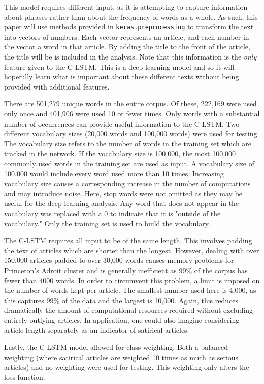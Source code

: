 \documentclass [12 pt] {report}
\begin{document}
This model requires different input, as it is attempting to capture information about phrases rather than about the frequency of words as a whole. As such, this paper will use methods provided in \texttt{keras.preprocessing} to transform the text into vectors of numbers. Each vector represents an article, and each number in the vector a word in that article. By adding the title to the front of the article, the title will be is included in the analysis. Note that this information is the \textit{only} feature given to the C-LSTM. This is a deep learning model and so it will hopefully learn what is important about these different texts without being provided with additional features.

There are 501,279 unique words in the entire corpus. Of these, 222,169 were used only once and 401,906 were used 10 or fewer times. Only words with a substantial number of occurrences can provide useful information to the C-LSTM. Two different vocabulary sizes (20,000 words and 100,000 words) were used for testing. The vocabulary size refers to the number of words in the training set which are tracked in the network. If the vocabulary size is 100,000, the most 100,000 commonly used words in the training set are used as input. A vocabulary size of 100,000 would include every word used more than 10 times. Increasing vocabulary size causes a corresponding increase in the number of computations and may introduce noise. Here, stop words were not omitted as they may be useful for the deep learning analysis. Any word that does not appear in the vocabulary was replaced with a 0 to indicate that it is "outside of the vocabulary." Only the training set is used to build the vocabulary.

The C-LSTM requires all input to be of the same length. This involves padding the text of articles which are shorter than the longest. However, dealing with over 150,000 articles padded to over 30,000 words causes memory problems for Princeton's Adroit cluster and is generally inefficient as 99\% of the corpus has fewer than 4000 words. In order to circumvent this problem, a limit is imposed on the number of words kept per article. The smallest number used here is 4,000, as this captures 99\% of the data and the largest is 10,000. Again, this reduces dramatically the amount of computational resources required without excluding entirely outlying articles. In application, one could also imagine considering article length separately as an indicator of satirical articles.

Lastly, the C-LSTM model allowed for class weighting. Both a balanced weighting (where satirical articles are weighted 10 times as much as serious articles) and no weighting were used for testing. This weighting only alters the loss function.
\end{document}
